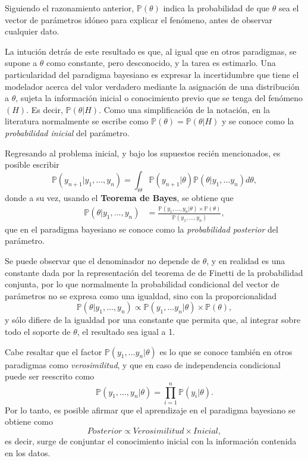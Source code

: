 Siguiendo el razonamiento anterior, $\mathbb{P}(\theta)$ indica la probabilidad de que $\theta$ sea el vector de par\'ametros id\'oneo para explicar el fen\'omeno, antes de observar cualquier dato.

La intuci\'on detr\'as de este resultado es que, al igual que en otros paradigmas, se supone a $\theta$ como constante, pero desconocido, y la tarea es estimarlo. Una particularidad del paradigma bayesiano es expresar la incertidumbre que tiene el modelador acerca del valor verdadero mediante la asignaci\'on de una distribuci\'on a $\theta$, sujeta la informaci\'on inicial o conocimiento previo que se tenga del fen\'omeno $(H)$. Es decir, $\mathbb{P}(\theta|H)$. Como una simplificaci\'on de la notaci\'on, en la literatura normalmente se escribe como $\mathbb{P}(\theta) = \mathbb{P}(\theta|H)$ y se conoce como la \textit{probabilidad inicial} del par\'ametro.

Regresando al problema inicial, y bajo los supuestos reci\'en mencionados, es posible escribir
\begin{equation*}
    \mathbb{P}(y_{n+1} | y_1,...,y_n) =
    \int_{\Theta} 
    \mathbb{P}(y_{n+1}|\theta) \mathbb{P}(\theta|y_1,...y_n)d\theta,
\end{equation*}
donde a su vez, usando el \textbf{Teorema de Bayes}, se obtiene que
\begin{equation*}
\begin{aligned}
    \mathbb{P}(\theta|y_1,...,y_n) &=
    \frac{\mathbb{P}(y_1,...,y_n|\theta)\times\mathbb{P}(\theta)}
    {\mathbb{P}(y_1,...,y_n)},
\end{aligned}
\end{equation*}
que en el paradigma bayesiano se conoce como la \textit{probabilidad posterior} del par\'ametro. 

Se puede observar que el denominador no depende de $\theta$, y en realidad es una constante dada por la representaci\'on del teorema de de Finetti de la probabilidad conjunta, por lo que normalmente la probabilidad condicional del vector de par\'ametros no se expresa como una igualdad, sino con la proporcionalidad
\begin{equation*}
    \mathbb{P}(\theta|y_1,...,y_n) 
    \propto 
    \mathbb{P}(y_1,...y_n|\theta) \times \mathbb{P}(\theta),
\end{equation*}
y s\'olo difiere de la igualdad por una constante que permita que, al integrar sobre todo el soporte de $\theta$, el resultado sea igual a 1.

Cabe resaltar que el factor $\mathbb{P}(y_1,...y_n|\theta)$ es lo que se conoce tambi\'en en otros paradigmas como \textit{verosimilitud}, y que en caso de independencia condicional puede ser reescrito como
\begin{equation*}
    \mathbb{P}(y_1,...,y_n|\theta)  = \prod_{i=1}^n \mathbb{P}(y_i|\theta).
\end{equation*}
Por lo tanto, es posible afirmar que el aprendizaje en el paradigma bayesiano se obtiene como
\begin{equation*}
    Posterior \propto Verosimilitud \times Inicial,
\end{equation*}
es decir, surge de conjuntar el conocimiento inicial con la informaci\'on contenida en los datos.

